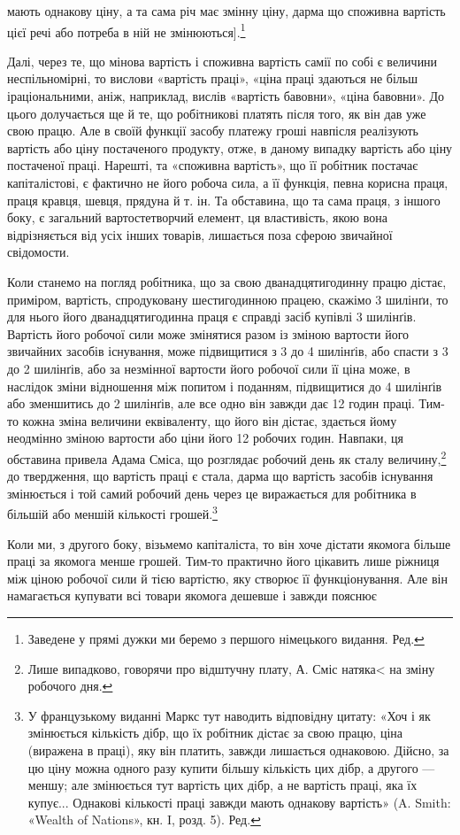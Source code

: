 мають однакову ціну, а та сама річ має змінну ціну, дарма що
споживна вартість цієї речі або потреба в ній не змінюються].\footnote*{
Заведене у прямі дужки ми беремо з першого німецького видання. Ред.
}

Далі, через те, що мінова вартість і споживна вартість самії
по собі є величини неспільномірні, то вислови «вартість праці»,
«ціна праці здаються не більш іраціональними, аніж, наприклад,
вислів «вартість бавовни», «ціна бавовни». До цього долучається
ще й те, що робітникові платять після того, як він дав
уже свою працю. Але в своїй функції засобу платежу гроші
навпісля реалізують вартість або ціну постаченого продукту,
отже, в даному випадку вартість або ціну постаченої праці.
Нарешті, та «споживна вартість», що її робітник постачає капіталістові,
є фактично не його робоча сила, а її функція, певна
корисна праця, праця кравця, шевця, прядуна й т. ін. Та обставина,
що та сама праця, з іншого боку, є загальний вартостетворчий
елемент, ця властивість, якою вона відрізняється від усіх
інших товарів, лишається поза сферою звичайної свідомости.

Коли станемо на погляд робітника, що за свою дванадцятигодинну
працю дістає, приміром, вартість, спродуковану шестигодинною
працею, скажімо 3 шилінґи, то для нього його дванадцятигодинна
праця є справді засіб купівлі 3 шилінґів. Вартість
його робочої сили може змінятися разом із зміною вартости його
звичайних засобів існування, може підвищитися з 3 до 4 шилінґів,
або спасти з 3 до 2 шилінґів, або за незмінної вартости його робочої
сили її ціна може, в наслідок зміни відношення між попитом
і поданням, підвищитися до 4 шилінґів або зменшитись до 2 шилінґів,
але все одно він завжди дає 12 годин праці. Тим-то кожна
зміна величини еквіваленту, що його він дістає, здається йому
неодмінно зміною вартости або ціни його 12 робочих годин.
Навпаки, ця обставина привела Адама Сміса, що розглядає
робочий день як сталу величину,\footnote{
Лише випадково, говорячи про відштучну плату, А. Сміс натяка<
на зміну робочого дня.
} до твердження, що вартість
праці є стала, дарма що вартість засобів існування змінюється
і той самий робочий день через це виражається для робітника
в більшій або меншій кількості грошей.\footnote*{
У французькому виданні Маркс тут наводить відповідну цитату:
«Хоч і як змінюється кількість дібр, що їх робітник дістає за свою
працю, ціна (виражена в праці), яку він платить, завжди лишається
однаковою. Дійсно, за цю ціну можна одного разу купити більшу кількість
цих дібр, а другого — меншу; але змінюється тут вартість цих
дібр, а не вартість праці, яка їх купує... Однакові кількості праці
завжди мають однакову вартість» (A. Smith: «Wealth of Nations», кн. I,
розд. 5). Ред.
}

Коли ми, з другого боку, візьмемо капіталіста, то він хоче
дістати якомога більше праці за якомога менше грошей. Тим-то
практично його цікавить лише ріжниця між ціною робочої сили
й тією вартістю, яку створює її функціонування. Але він намагається
купувати всі товари якомога дешевше і завжди пояснює